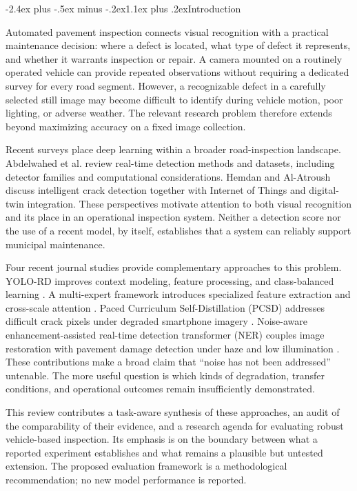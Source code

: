 \documentclass[11pt,a4paper]{article}
\makeatletter
\renewcommand\section{\@startsection{section}{1}{\z@}%
  {-2.4ex plus -.5ex minus -.2ex}{1.1ex plus .2ex}{\normalfont\large\bfseries}}
\makeatother
\begin{document}
\section{Introduction}

Automated pavement inspection connects visual recognition with a practical maintenance decision: where a defect is located, what type of defect it represents, and whether it warrants inspection or repair. A camera mounted on a routinely operated vehicle can provide repeated observations without requiring a dedicated survey for every road segment. However, a recognizable defect in a carefully selected still image may become difficult to identify during vehicle motion, poor lighting, or adverse weather. The relevant research problem therefore extends beyond maximizing accuracy on a fixed image collection.

Recent surveys place deep learning within a broader road-inspection landscape. Abdelwahed et al. \cite{r1} review real-time detection methods and datasets, including detector families and computational considerations. Hemdan and Al-Atroush \cite{r2} discuss intelligent crack detection together with Internet of Things and digital-twin integration. These perspectives motivate attention to both visual recognition and its place in an operational inspection system. Neither a detection score nor the use of a recent model, by itself, establishes that a system can reliably support municipal maintenance.

Four recent journal studies provide complementary approaches to this problem. YOLO-RD improves context modeling, feature processing, and class-balanced learning \cite{r3}. A multi-expert framework introduces specialized feature extraction and cross-scale attention \cite{r4}. Paced Curriculum Self-Distillation (PCSD) addresses difficult crack pixels under degraded smartphone imagery \cite{r5}. Noise-aware enhancement-assisted real-time detection transformer (NER) couples image restoration with pavement damage detection under haze and low illumination \cite{r6}. These contributions make a broad claim that ``noise has not been addressed'' untenable. The more useful question is which kinds of degradation, transfer conditions, and operational outcomes remain insufficiently demonstrated.

This review contributes a task-aware synthesis of these approaches, an audit of the comparability of their evidence, and a research agenda for evaluating robust vehicle-based inspection. Its emphasis is on the boundary between what a reported experiment establishes and what remains a plausible but untested extension. The proposed evaluation framework is a methodological recommendation; no new model performance is reported.
\end{document}
